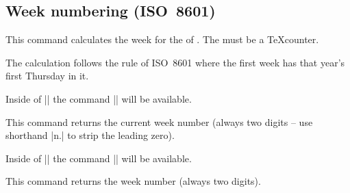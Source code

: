 \begin{multicols}{2}
\subsection{Week numbering (ISO~8601)}
\label{calendar:weeknumbering}
\begin{command}{\pgfcalendarjulianyeartoweek{}}
  This command calculates the week for the  of .
  The  must be a \TeX\space counter.

  The calculation follows the rule of ISO~8601 where the first week has that
  year's first Thursday in it.
\end{command}

Inside of |\pgfcalendar| the command |\pgfcalendarcurrentweek| will be available.
\begin{command}{\pgfcalendarcurrentweek}
  This command returns the current week number (always two digits -- use shorthand |n.|
  to strip the leading zero).
\end{command}

Inside of |\ifdate| the command |\pgfcalendarifdateweek| will be available.
\begin{command}{\pgfcalendarifdateweek}
  This command returns the week number (always two digits).
\end{command}
\end{multicols}